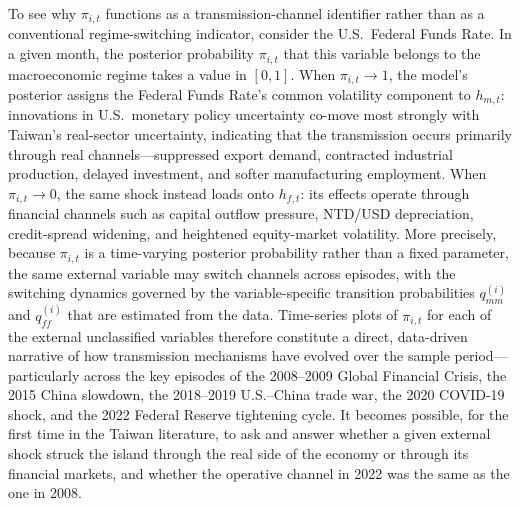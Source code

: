 To see why $\pi_{i,t}$ functions as a transmission-channel identifier rather than as a conventional regime-switching indicator, consider the U.S.\ Federal Funds Rate. In a given month, the posterior probability $\pi_{i,t}$ that this variable belongs to the macroeconomic regime takes a value in $[0,1]$. When $\pi_{i,t} \to 1$, the model's posterior assigns the Federal Funds Rate's common volatility component to $h_{m,t}$: innovations in U.S.\ monetary policy uncertainty co-move most strongly with Taiwan's real-sector uncertainty, indicating that the transmission occurs primarily through real channels---suppressed export demand, contracted industrial production, delayed investment, and softer manufacturing employment. When $\pi_{i,t} \to 0$, the same shock instead loads onto $h_{f,t}$: its effects operate through financial channels such as capital outflow pressure, NTD/USD depreciation, credit-spread widening, and heightened equity-market volatility. More precisely, because $\pi_{i,t}$ is a time-varying posterior probability rather than a fixed parameter, the same external variable may switch channels across episodes, with the switching dynamics governed by the variable-specific transition probabilities $q_{mm}^{(i)}$ and $q_{ff}^{(i)}$ that are estimated from the data. Time-series plots of $\pi_{i,t}$ for each of the external unclassified variables therefore constitute a direct, data-driven narrative of how transmission mechanisms have evolved over the sample period---particularly across the key episodes of the 2008--2009 Global Financial Crisis, the 2015 China slowdown, the 2018--2019 U.S.--China trade war, the 2020 COVID-19 shock, and the 2022 Federal Reserve tightening cycle. It becomes possible, for the first time in the Taiwan literature, to ask and answer whether a given external shock struck the island through the real side of the economy or through its financial markets, and whether the operative channel in 2022 was the same as the one in 2008.

